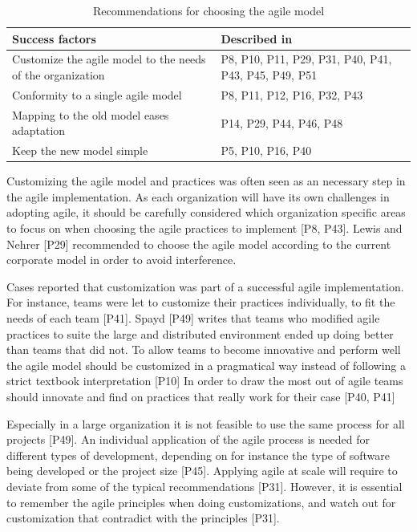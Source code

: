 \documentclass[preprint,authoryear,12pt]{elsarticle}
\begin{document}
\begin{table}[h]
    \centering
    \begin{tabular}{ >{\raggedright\arraybackslash}p{}
                     >{\raggedright\arraybackslash}p{} }
        \toprule
        Success factors  &  Described in \\
        \midrule
        Customize the agile model to the needs of the organization  &
                P8, P10, P11, P29, P31, P40, P41, P43, P45, P49, P51  \\
        Conformity to a single agile model  &
                P8, P11, P12, P16, P32, P43  \\
        Mapping to the old model eases adaptation  &
                P14, P29, P44, P46, P48  \\
        Keep the new model simple  &
                P5, P10, P16, P40  \\
        \bottomrule
    \end{tabular}
    \caption{Recommendations for choosing the agile model}
    \label{table:success_choosemodel}
\end{table}



Customizing the agile model and practices was often seen as an necessary step in
the agile implementation. As each organization will have its own challenges in
adopting agile, it should be carefully considered which organization specific
areas to focus on when choosing the agile practices to implement [P8, P43].
Lewis and Nehrer [P29] recommended to choose the agile model according to the
current corporate model in order to avoid interference.

Cases reported that customization was part of a successful agile implementation.
For instance, teams were let to customize their practices individually, to fit
the needs of each team [P41].
Spayd [P49] writes that teams who modified agile practices to suite the large and
distributed environment ended up doing better than teams that did not.
To allow teams to become innovative and perform well the agile model should be
customized in a pragmatical way instead of following a strict textbook
interpretation [P10]
In order to draw the most out of agile teams should innovate and find on
practices that really work for their case [P40, P41]

Especially in a large organization it is not feasible to use the same process
for all projects [P49]. An individual application of the agile process is needed
for different types of development, depending on for instance the type of
software being developed or the project size [P45].
Applying agile at scale will require to deviate from some of the typical
recommendations [P31]. However, it is essential to remember the agile principles
when doing customizations, and watch out for customization that contradict with
the principles [P31].
\end{document}
